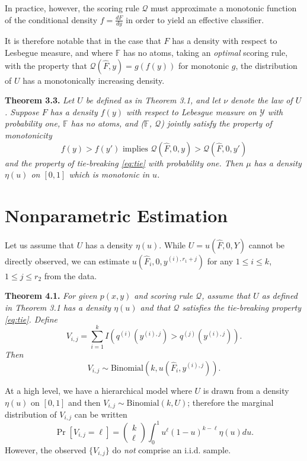 \documentclass{article}
\begin{document}
In practice, however, the scoring rule $\mathcal{Q}$ must approximate
a monotonic function of the conditional density $f = \frac{dF}{dy}$ in order to
yield an effective classifier.

It is therefore notable that in the case that $F$ has a density with
respect to Lesbegue measure, and where $\mathbb{F}$ has no atoms,
taking an \emph{optimal} scoring rule, with the property that
$\mathcal{Q}(\hat{F}, y) = g(f(y))$ for monotonic $g$, the
distribution of $U$ has a monotonically increasing density.

\noindent\textbf{Theorem 3.3.} \emph{ Let $U$ be defined as in Theorem
  3.1, and let $\nu$ denote the law of $U$.  Suppose $F$ has a density
  $f(y)$ with respect to Lebesgue measure on $\mathcal{Y}$ with
  probability one, $\mathbb{F}$ has no atoms, and ($\mathbb{F}$,
  $\mathcal{Q}$) jointly satisfy the property of monotonicity
  \[
  f(y) > f(y') \text{ implies } \mathcal{Q}(\hat{F}, 0, y) > \mathcal{Q}(\hat{F}, 0, y')
  \]
  and the property of tie-breaking \eqref{eq:tie} with probability one.
  Then $\mu$ has a density $\eta(u)$ on $[0, 1]$ which is monotonic in $u$.
}

\section{Nonparametric Estimation}

Let us assume that $U$ has a density $\eta(u)$.  While $U = u(\hat{F},
0, Y)$ cannot be directly observed, we can estimate $u(\hat{F}_i, 0,
y^{(i), r_1 + j})$ for any $1 \leq i \leq k$, $1 \leq j \leq r_2$ from
the data.

\noindent\textbf{Theorem 4.1.}\emph{
For given $p(x, y)$ and scoring rule $\mathcal{Q}$, assume that $U$ as defined in Theorem 3.1 has a density $\eta(u)$
and that $\mathcal{Q}$ satisfies the tie-breaking property \eqref{eq:tie}.
Define
\[
V_{i, j} = \sum_{i=1}^k I(q^{(i)}(y^{(i), j}) > q^{(j)}(y^{(i), j})).
\]
Then
\[
V_{i, j} \sim \text{Binomial}(k, u(\hat{F}_i, y^{(i), j})).
\]}

At a high level, we have a hierarchical model where $U$ is drawn from a density $\eta(u)$ on $[0, 1]$
and then $V_{i, j} \sim \text{Binomial}(k, U)$;
therefore the marginal distribution of $V_{i, j}$ can be written
\[
\Pr[V_{i,j} = \ell] = \begin{pmatrix}
k \\ \ell
\end{pmatrix}
\int_0^1 u^\ell (1-u)^{k-\ell} \eta(u) du.
\]
However, the observed $\{V_{i, j}\}$ do \emph{not} comprise an i.i.d. sample.
\end{document}
